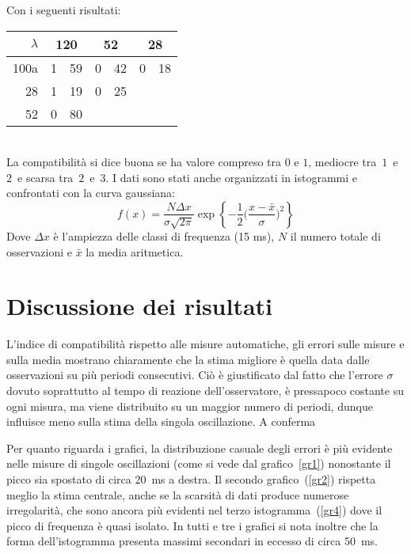 \documentclass[italian,a4paper,10pt]{article}
\theoremstyle{definition}
\begin{document}
Con i seguenti risultati:
\begin{table}[h]\centering
\begin{tabular}{@{}r|r@{.}l r@{.}l r@{.}l}
 $\lambda$	&
 \multicolumn{2}{c}{120}
&   \multicolumn{2}{c}{52}
&   \multicolumn{2}{c}{28}  		\\
 \hline
 100a 		&  1&59 	&  0&42 	& 0&18 		\\
 28   		&  1&19 	&  0&25 	& \multicolumn{2}{c}{} \\
 52  	 	&  0&80 	& \multicolumn{2}{c}{}	& \multicolumn{2}{c}{}		 \\
\end{tabular}
\end{table}\\
La compatibilità si dice buona se ha valore compreso tra $0$ e $1$, mediocre tra~$1$~e~$2$~e scarsa tra~$2$~e~$3$.
I dati sono stati anche organizzati in istogrammi e confrontati con la curva gaussiana:
\begin{equation*}
 f(x) = \dfrac{N\Delta x}{\sigma \sqrt{2\pi}}\exp \left\{-\dfrac 1 2 \Big({\dfrac{x-\bar{x}}{\sigma}}\Big)^2\right\}
\end{equation*}
Dove $\Delta x$ è l'ampiezza delle classi di frequenza (15 ms), $N$ il numero totale di osservazioni e $\bar{x}$ la media aritmetica.
\section{Discussione dei risultati}
L'indice di compatibilità rispetto alle misure automatiche, gli errori sulle misure e sulla media mostrano chiaramente che la stima migliore è quella data dalle osservazioni su più periodi consecutivi. Ciò è giustificato dal fatto che l'errore $\sigma$ dovuto soprattutto al tempo di reazione dell'osservatore, è pressapoco costante su ogni misura, ma viene distribuito su un maggior numero di periodi, dunque influisce meno sulla stima della singola oscillazione. A conferma 

Per quanto riguarda i grafici, la distribuzione casuale degli errori è più evidente nelle misure di singole oscillazioni (come si vede dal grafico~\ref{gr1}) nonostante il picco sia spostato di circa 20~ms a destra. Il secondo grafico~(\ref{gr2}) rispetta meglio la stima centrale, anche se la scarsità di dati produce numerose irregolarità, che sono ancora più evidenti nel terzo istogramma~(\ref{gr4}) dove il picco di frequenza è quasi isolato. In tutti e tre i grafici si nota inoltre che la forma dell'istogramma presenta massimi secondari in eccesso di circa 50~ms.
\end{document}
